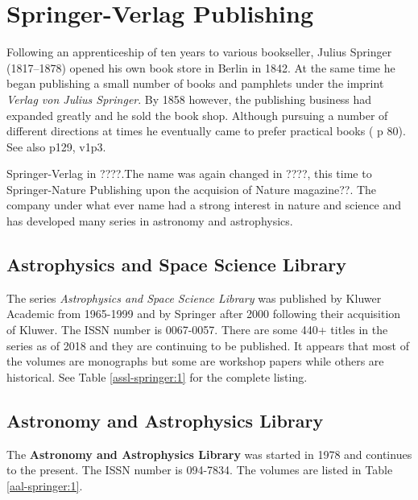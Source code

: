 \section{Springer-Verlag Publishing}

Following an apprenticeship of ten years to various bookseller, Julius
Springer (1817--1878) opened his own book store in Berlin in 1842. At
the same time he began publishing a small number of books and pamphlets
under the imprint {\it Verlag von Julius Springer}.  By 1858 however,
the publishing business had expanded greatly and he sold the book
shop. Although pursuing a number of different directions at times he
eventually came to prefer practical books (\cite{Sarkowski1996} p 80).
See also p129, v1p3.

Springer-Verlag in ????.The name was again changed in ????, this time
to Springer-Nature Publishing upon the acquision of Nature magazine??.
The company under what ever name had a strong interest in nature and
science and has developed many series in astronomy and astrophysics.

\subsection{Astrophysics and Space Science Library}

The series {\it Astrophysics and Space Science Library} was published
by Kluwer Academic from 1965-1999 and by Springer after 2000 following
their acquisition of Kluwer.  The ISSN number is 0067-0057. There are
some 440+ titles in the series as of 2018 and they are continuing to
be published.  It appears that most of the volumes are monographs but
some are workshop papers while others are historical. See Table
\ref{assl-springer:1} for the complete listing.

\subsection{Astronomy and Astrophysics Library}
  
The {\bf Astronomy and Astrophysics Library} was started in 1978 and
continues to the present. The ISSN number is 094-7834. The volumes are
listed in Table \ref{aal-springer:1}.
